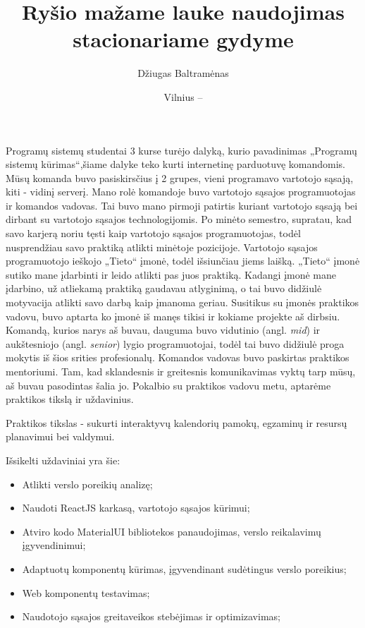 \documentclass{VUMIFPSbakalaurinis}
\title{Ryšio mažame lauke naudojimas stacionariame gydyme}
\author{Džiugas Baltramėnas}
\date{Vilnius – \the\year}
\begin{document}
\maketitle

\tableofcontents

Programų sistemų studentai 3 kurse turėjo dalyką, kurio pavadinimas „Programų sistemų kūrimas“,šiame dalyke teko kurti internetinę parduotuvę komandomis. Mūsų komanda buvo pasiskirsčius į 2 grupes, vieni programavo vartotojo sąsają, kiti - vidinį serverį. Mano rolė komandoje buvo vartotojo sąsajos programuotojas ir komandos vadovas. Tai buvo mano pirmoji patirtis kuriant vartotojo sąsają bei dirbant su vartotojo sąsajos technologijomis. Po minėto semestro, supratau, kad savo karjerą noriu tęsti kaip vartotojo sąsajos programuotojas, todėl nusprendžiau savo praktiką atlikti minėtoje pozicijoje. Vartotojo sąsajos programuotojo ieškojo „Tieto“ įmonė, todėl išsiunčiau jiems laišką. „Tieto“ įmonė sutiko mane įdarbinti ir leido atlikti pas juos praktiką. Kadangi įmonė mane įdarbino, už atliekamą praktiką gaudavau atlyginimą, o tai buvo didžiulė motyvacija atlikti savo darbą kaip įmanoma geriau. Susitikus su įmonės praktikos vadovu, buvo aptarta ko įmonė iš manęs tikisi ir kokiame projekte aš dirbsiu. Komandą, kurios narys aš buvau, dauguma buvo vidutinio (angl. \textit{mid}) ir aukštesniojo (angl. \textit{senior}) lygio programuotojai, todėl tai buvo didžiulė proga mokytis iš šios srities profesionalų. Komandos vadovas buvo paskirtas praktikos mentoriumi. Tam, kad sklandesnis ir greitesnis komunikavimas vyktų tarp mūsų, aš buvau pasodintas šalia jo. Pokalbio su praktikos vadovu metu, aptarėme praktikos tikslą ir uždavinius.

Praktikos tikslas - sukurti interaktyvų kalendorių pamokų, egzaminų ir resursų planavimui bei valdymui.

Išsikelti uždaviniai yra šie:
\begin{itemize}
    \item Atlikti verslo poreikių analizę;
    \item Naudoti ReactJS karkasą, vartotojo sąsajos kūrimui;
    \item Atviro kodo MaterialUI bibliotekos panaudojimas, verslo reikalavimų įgyvendinimui;
    \item Adaptuotų komponentų kūrimas, įgyvendinant sudėtingus verslo poreikius;
    \item Web komponentų testavimas;
    \item Naudotojo sąsajos greitaveikos stebėjimas ir optimizavimas;
\end{itemize}
\end{document}

